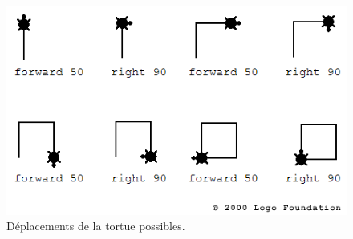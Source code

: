 \begin{figure}[H]
  \includegraphics[width=\textwidth]{../resources/illustrations/logo_screen}
  \caption{Déplacements de la tortue possibles.}
\end{figure}

